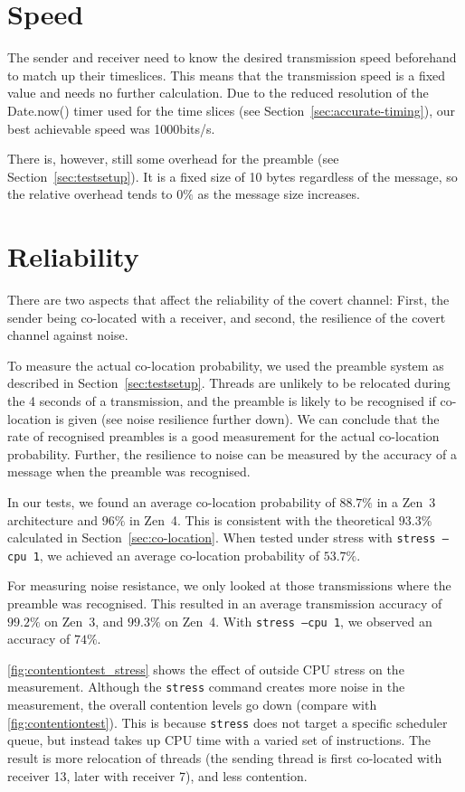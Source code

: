 \documentclass[11pt,
  titlepage=false,
]{scrreprt}
\begin{document}
\section{Speed}
The sender and receiver need to know the desired transmission speed beforehand to match up their timeslices.
This means that the transmission speed is a fixed value and needs no further calculation.
Due to the reduced resolution of the Date.now() timer used for the time slices (see Section~\ref{sec:accurate-timing}),
our best achievable speed was 1000bits/s.

There is, however, still some overhead for the preamble (see Section~\ref{sec:testsetup}).
It is a fixed size of 10 bytes regardless of the message,
so the relative overhead tends to $0\%$ as the message size increases.

\section{Reliability}
There are two aspects that affect the reliability of the covert channel:
First, the sender being co-located with a receiver, and second, the resilience of the covert channel against noise.

To measure the actual co-location probability, we used the preamble system as described in Section~\ref{sec:testsetup}.
Threads are unlikely to be relocated during the 4 seconds of a transmission,
and the preamble is likely to be recognised if co-location is given (see noise resilience further down).
We can conclude that the rate of recognised preambles is a good measurement for the actual co-location probability.
Further, the resilience to noise can be measured by the accuracy of a message when the preamble was recognised.

In our tests, we found an average co-location probability of $88.7\%$ in a Zen~3 architecture and $96\%$ in Zen~4.
This is consistent with the theoretical $93.3\%$ calculated in Section~\ref{sec:co-location}.
When tested under stress with \texttt{stress --cpu 1}, we achieved an average co-location probability of $53.7\%$.

For measuring noise resistance, we only looked at those transmissions where the preamble was recognised.
This resulted in an average transmission accuracy of $99.2\%$ on Zen~3, and $99.3\%$ on Zen~4.
With \texttt{stress --cpu 1}, we observed an accuracy of $74\%$.

\ref{fig:contentiontest_stress} shows the effect of outside CPU stress on the measurement.
Although the \texttt{stress} command creates more noise in the measurement, the overall contention levels go down (compare with \ref{fig:contentiontest}).
This is because \texttt{stress} does not target a specific scheduler queue, but instead takes up CPU time with a varied set of instructions.
The result is more relocation of threads (the sending thread is first co-located with receiver 13, later with receiver 7), and less contention.
\end{document}
